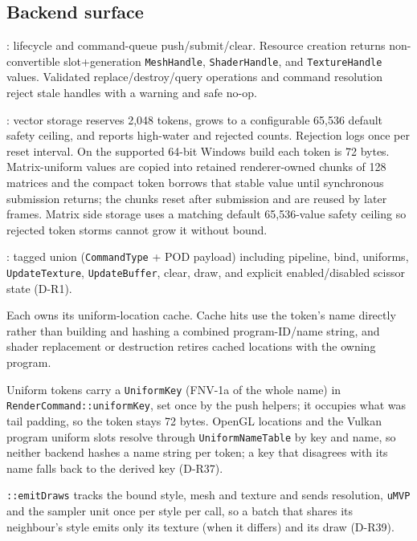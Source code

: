 \subsection{Backend surface}
: lifecycle and command-queue push/submit/clear. Resource
creation returns non-convertible slot+generation \texttt{MeshHandle},
\texttt{ShaderHandle}, and \texttt{TextureHandle} values. Validated
replace/destroy/query operations and command resolution reject stale handles
with a warning and safe no-op.

: vector storage reserves 2,048 tokens, grows to a
configurable 65,536 default safety ceiling, and reports high-water and rejected
counts. Rejection logs once per reset interval. On the supported 64-bit Windows
build each token is 72 bytes. Matrix-uniform values are copied into retained
renderer-owned chunks of 128 matrices and the compact token borrows that stable
value until synchronous submission returns; the chunks reset after submission
and are reused by later frames. Matrix side storage uses a matching default
65,536-value safety ceiling so rejected token storms cannot grow it without
bound.

: tagged union (\texttt{CommandType} + POD payload)
including pipeline, bind, uniforms, \texttt{UpdateTexture}, \texttt{UpdateBuffer},
clear, draw, and explicit enabled/disabled scissor state (D-R1).

Each  owns its uniform-location cache. Cache hits use
the token's name directly rather than building and hashing a combined
program-ID/name string, and shader replacement or destruction retires cached
locations with the owning program.

Uniform tokens carry a \texttt{UniformKey} (FNV-1a of the whole name) in
\texttt{RenderCommand::uniformKey}, set once by the  push
helpers; it occupies what was tail padding, so the token stays 72 bytes. OpenGL
locations and the Vulkan program uniform slots resolve through
\texttt{UniformNameTable} by key and name, so neither backend hashes a name
string per token; a key that disagrees with its name falls back to the derived
key (D-R37).

\texttt{::emitDraws} tracks the bound style, mesh and
texture and sends resolution, \texttt{uMVP} and the sampler unit once per
style per call, so a batch that shares its neighbour's style emits only its
texture (when it differs) and its draw (D-R39).

